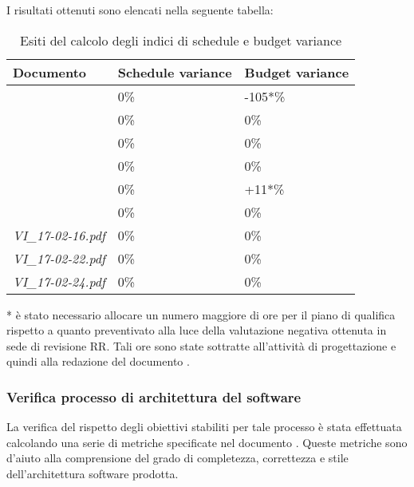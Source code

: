 		I risultati ottenuti sono elencati nella seguente tabella:	
		\begin{table}[H]
		\begin{tabular}{|l|l|l|}
		\hline
		\textbf{Documento} 		&\textbf{Schedule variance} &\textbf{Budget variance} 		\\
		\hline
		\PdQ 					&0\%		&-105*\%\\
		\NdP 					&0\%		&0\%\\
		\AdR 					&0\%		&0\%\\
		\PdP 					&0\%		&0\%\\
		\ST					&0\%		&+11*\%\\
		\Glossario 				&0\%		&0\%\\
		\textit{VI_17-02-16.pdf} 		&0\%		&0\%\\
		\textit{VI_17-02-22.pdf} 		&0\%		&0\%\\
		\textit{VI_17-02-24.pdf} 		&0\%		&0\%\\
		\hline
		\end{tabular}
		\caption{Esiti del calcolo degli indici di schedule e budget variance}
		\end{table}
		* è stato necessario allocare un numero maggiore di ore per il piano di qualifica rispetto a quanto preventivato alla luce della valutazione negativa ottenuta in sede di revisione RR. Tali ore sono state sottratte all'attività di progettazione e quindi alla redazione del documento \ST.
		
		\subsubsection{Verifica processo di architettura del software}
		La verifica del rispetto degli obiettivi stabiliti per tale processo è stata effettuata calcolando una serie di metriche specificate nel documento \NdP. Queste metriche sono d'aiuto alla comprensione del grado di completezza, correttezza e stile dell'architettura software prodotta.
		
